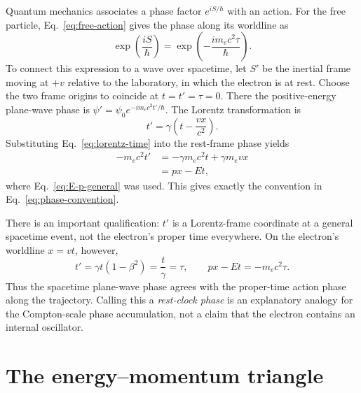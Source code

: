 \documentclass[12pt]{article}
\begin{document}
Quantum mechanics associates a phase factor $e^{iS/\hbar}$ with an action. For the free particle, Eq.~\eqref{eq:free-action} gives the phase along its worldline as
\begin{equation}
  \exp\!\left(\frac{iS}{\hbar}\right)
  =\exp\!\left(-\frac{i m_ec^2\tau}{\hbar}\right).
  \label{eq:proper-time-phase}
\end{equation}
To connect this expression to a wave over spacetime, let $S'$ be the inertial frame moving at $+v$ relative to the laboratory, in which the electron is at rest. Choose the two frame origins to coincide at $t=t'=\tau=0$. There the positive-energy plane-wave phase is $\psi'=\psi_0e^{-im_ec^2t'/\hbar}$. The Lorentz transformation is
\begin{equation}
  t'=\gamma\left(t-\frac{vx}{c^2}\right).
  \label{eq:lorentz-time}
\end{equation}
Substituting Eq.~\eqref{eq:lorentz-time} into the rest-frame phase yields
\begin{align}
  -m_ec^2t'
  &=-\gamma m_ec^2t+\gamma m_ev x \\
  &=px-Et,
  \label{eq:boosted-phase-action}
\end{align}
where Eq.~\eqref{eq:E-p-general} was used. This gives exactly the convention in Eq.~\eqref{eq:phase-convention}.

There is an important qualification: $t'$ is a Lorentz-frame coordinate at a general spacetime event, not the electron's proper time everywhere. On the electron's worldline $x=vt$, however,
\begin{equation}
  t'=\gamma t(1-\beta^2)=\frac{t}{\gamma}=\tau,
  \qquad
  px-Et=-m_ec^2\tau.
  \label{eq:phase-on-worldline}
\end{equation}
Thus the spacetime plane-wave phase agrees with the proper-time action phase along the trajectory. Calling this a \emph{rest-clock phase} is an explanatory analogy for the Compton-scale phase accumulation, not a claim that the electron contains an internal oscillator.

\section{The energy--momentum triangle}
\end{document}
